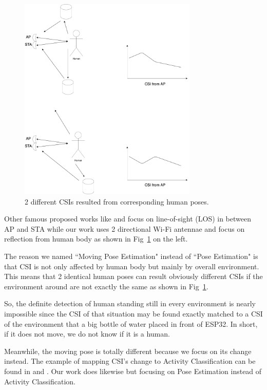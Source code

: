 \documentclass[10pt,letterpaper]{article}
\begin{document}
	\begin{figure}[htbp]
		
		\centerline{\includegraphics[width=85mm,scale=0.5]{ESP32CSI03.png}}
		\caption{2 different CSIs resulted from corresponding human poses.}
		\label{fig:ESP32CSI02}
	\end{figure}
	
	Other famous proposed works like \cite{wangF} \cite{liuJ} and \cite{hernandezSM} focus on line-of-sight (LOS) in between AP and STA while our work uses 2 directional Wi-Fi antennae and focus on reflection from human body as shown in Fig~\ref{fig:ESP32CSI02} on the left.
	
	
	The reason we named ``Moving Pose Estimation" instead of ``Pose Estimation" is that CSI is not only affected by human body but mainly by overall environment. This means that 2 identical human poses can result obviously different CSIs if the environment around are not exactly the same as shown in Fig~\ref{fig:ESP32CSI02}.
	
	
	So, the definite detection of human standing still in every environment is nearly impossible since the CSI of that situation may be found exactly matched to a CSI of the environment that a big bottle of water placed in front of ESP32.
	In short, if it does not move, we do not know if it is a human.
	
	Meanwhile, the moving pose is totally different because we focus on its change instead. The example of mapping CSI's change to Activity Classification can be found in \cite{chowdhuryTZ} and \cite{zouH}. Our work does likewise but focusing on Pose Estimation instead of Activity Classification.
	
\end{document}
